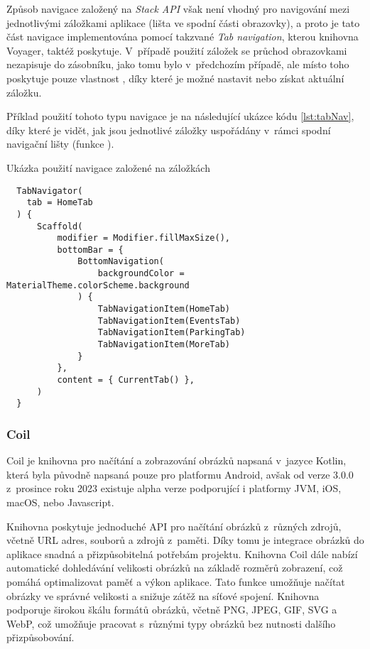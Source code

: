 \medskip

Způsob navigace založený na \textit{Stack API} však není vhodný pro navigování mezi jednotlivými záložkami aplikace (lišta ve spodní 
části obrazovky), a proto je tato část navigace implementována pomocí takzvané \textit{Tab navigation}, kterou knihovna Voyager, taktéž poskytuje.
V~případě použití záložek se průchod obrazovkami nezapisuje do zásobníku, jako tomu bylo v~předchozím případě, ale místo toho poskytuje pouze vlastnost 
, díky které je možné nastavit nebo získat aktuální záložku. \cite{voyagerTabNav} 

\medskip

Příklad použití tohoto typu navigace je na následující ukázce kódu \ref{lst:tabNav}, díky které je vidět, jak jsou jednotlivé záložky 
uspořádány v~rámci spodní navigační lišty (funkce ).

\begin{listing}[H]
\caption{Ukázka použití navigace založené na záložkách}\label{lst:tabNav}
\begin{verbatim}
  TabNavigator(
    tab = HomeTab
  ) {
      Scaffold(
          modifier = Modifier.fillMaxSize(),
          bottomBar = {
              BottomNavigation(
                  backgroundColor = MaterialTheme.colorScheme.background
              ) {
                  TabNavigationItem(HomeTab)
                  TabNavigationItem(EventsTab)
                  TabNavigationItem(ParkingTab)
                  TabNavigationItem(MoreTab)
              }
          },
          content = { CurrentTab() },
      )
  }
\end{verbatim}
\end{listing}

\subsubsection*{Coil}
Coil je knihovna pro načítání a zobrazování obrázků napsaná v~jazyce Kotlin, která byla původně napsaná pouze pro platformu Android, avšak
od verze 3.0.0 z~prosince roku 2023 existuje alpha verze podporující i platformy JVM, iOS, macOS, nebo Javascript.  

\medskip

Knihovna poskytuje jednoduché API pro načítání obrázků
z~různých zdrojů, včetně URL adres, souborů a zdrojů z~paměti. Díky tomu je integrace obrázků do aplikace snadná a přizpůsobitelná potřebám projektu.
Knihovna Coil dále nabízí automatické dohledávání velikosti obrázků na základě rozměrů zobrazení, což pomáhá optimalizovat paměť a výkon aplikace. Tato funkce 
umožňuje načítat obrázky ve správné velikosti a snižuje zátěž na síťové spojení. Knihovna podporuje širokou škálu formátů obrázků, včetně PNG, 
JPEG, GIF, SVG a WebP, což umožňuje pracovat s~různými typy obrázků bez nutnosti dalšího přizpůsobování.

